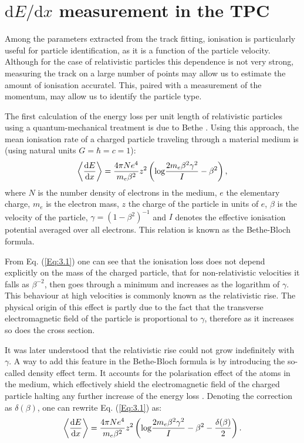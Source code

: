 \section[\texorpdfstring{$\mathrm{d}E/\mathrm{d}x$}{dE/dx} measurement in the TPC]{\boldmath\texorpdfstring{$\mathrm{d}E/\mathrm{d}x$}{dE/dx} measurement in the TPC}

Among the parameters extracted from the track fitting, ionisation is particularly useful for particle identification, as it is a function of the particle velocity. Although for the case of relativistic particles this dependence is not very strong, measuring the track on a large number of points may allow us to estimate the amount of ionisation accuratel. This, paired with a measurement of the momentum, may allow us to identify the particle type.

The first calculation of the energy loss per unit length of relativistic particles using a quantum-mechanical treatment is due to Bethe \cite{Bethe1930}. Using this approach, the mean ionisation rate of a charged particle traveling through a material medium is (using natural units $G=\hbar=c=1$):
\begin{equation}\label{Eq:3.1}
    \expval{\frac{\mathrm{d}E}{\mathrm{d}x}} = \frac{4 \pi N e^{4}}{m_{e}\beta^{2}} z^{2} \left(\mathrm{log} \frac{2m_{e}\beta^{2}\gamma^{2}}{I} - \beta^{2}\right),
\end{equation}
where $N$ is the number density of electrons in the medium, $e$ the elementary charge, $m_{e}$ is the electron mass, $z$ the charge of the particle in units of $e$, $\beta$ is the velocity of the particle, $\gamma = (1-\beta^{2})^{-1}$ and $I$ denotes the effective ionisation potential averaged over all electrons. This relation is known as the Bethe-Bloch formula.

From Eq. (\ref{Eq:3.1}) one can see that the ionisation loss does not depend explicitly on the mass of the charged particle, that for non-relativistic velocities it falls as $\beta^{-2}$, then goes through a minimum and increases as the logarithm of $\gamma$. This behaviour at high velocities is commonly known as the relativistic rise. The physical origin of this effect is partly due to the fact that the transverse electromagnetic field of the particle is proportional to $\gamma$, therefore as it increases so does the cross section.

It was later understood that the relativistic rise could not grow indefinitely with $\gamma$. A way to add this feature in the Bethe-Bloch formula is by introducing the so-called density effect term. It accounts for the polarisation effect of the atoms in the medium, which effectively shield the electromagnetic field of the charged particle halting any further increase of the energy loss \cite{Fermi1940}. Denoting the correction as $\delta(\beta)$, one can rewrite Eq. (\ref{Eq:3.1}) as:
\begin{equation}\label{Eq:3.2}
    \expval{\frac{\mathrm{d}E}{\mathrm{d}x}} = \frac{4 \pi N e^{4}}{m_{e}\beta^{2}} z^{2} \left(\mathrm{log} \frac{2m_{e}\beta^{2}\gamma^{2}}{I} - \beta^{2}-\frac{\delta(\beta)}{2}\right).
\end{equation}

